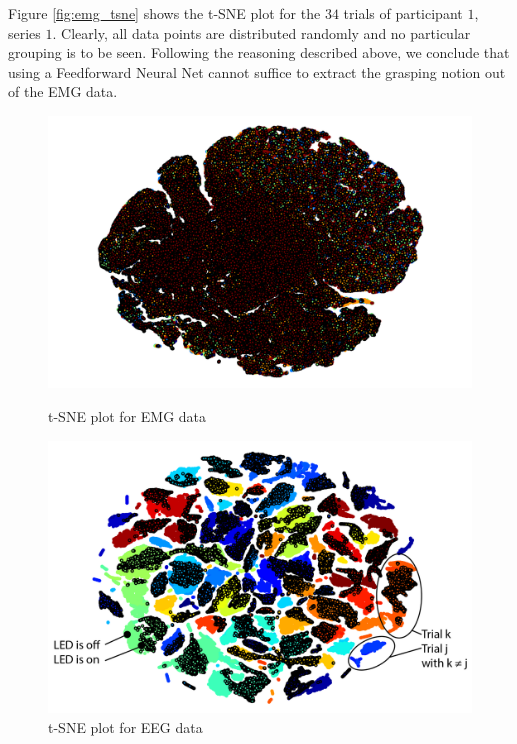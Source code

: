 \documentclass{article} %
\begin{document}
Figure \ref{fig:emg_tsne} shows the t-SNE plot for the $34$ trials of participant $1$, series $1$. Clearly, all data points are distributed randomly and no particular grouping is to be seen. Following the reasoning described above, we conclude that using a Feedforward Neural Net cannot suffice to extract the grasping notion out of the EMG data.
\begin{figure}
	\centering
	\begin{minipage}{0.5\textwidth}
		\centering
		\includegraphics[width=1.0\textwidth]{images/emg_tsne.png}
		\caption{t-SNE plot for EMG data}
		\label{fig:emg_tsne}
	\end{minipage}\hfill
	\begin{minipage}{0.5\textwidth}
		\centering
		\includegraphics[width=1.0\textwidth]{images/eeg_tsne.png}
		\caption{t-SNE plot for EEG data}
		\label{fig:eeg_tsne}
	\end{minipage}
\end{figure}\\
\end{document}
